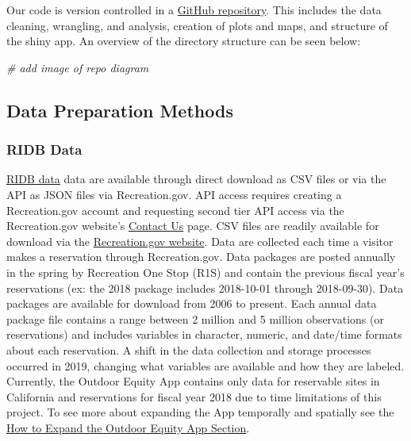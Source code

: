 \documentclass[
  11 pt,
  openany]{book}
\newenvironment{Shaded}{\begin{snugshade}}{\end{snugshade}}
\newcommand{\CommentTok}[1]{\textcolor[rgb]{0.56,0.35,0.01}{\textit{#1}}}
\begin{document}
Our code is version controlled in a \href{https://github.com/outdoor-equity/outdoor-equity}{GitHub repository}. This includes the data cleaning, wrangling, and analysis, creation of plots and maps, and structure of the shiny app. An overview of the directory structure can be seen below:

\begin{Shaded}
\begin{Highlighting}[]
\CommentTok{\# add image of repo diagram}
\end{Highlighting}
\end{Shaded}

\hypertarget{data-preparation-methods}{%
\subsection{Data Preparation Methods}\label{data-preparation-methods}}

\hypertarget{ridb-data}{%
\subsubsection{RIDB Data}\label{ridb-data}}

\href{https://ridb.recreation.gov/landing}{RIDB data} data are available through direct download as CSV files or via the API as JSON files via Recreation.gov. API access requires creating a Recreation.gov account and requesting second tier API access via the Recreation.gov website's \href{https://recreationonestopprod.servicenowservices.com/external?id=external_contact_us}{Contact Us} page. CSV files are readily available for download via the \href{https://ridb.recreation.gov/download}{Recreation.gov website}. Data are collected each time a visitor makes a reservation through Recreation.gov. Data packages are posted annually in the spring by Recreation One Stop (R1S) and contain the previous fiscal year's reservations (ex: the 2018 package includes 2018-10-01 through 2018-09-30). Data packages are available for download from 2006 to present. Each annual data package file contains a range between 2 million and 5 million observations (or reservations) and includes variables in character, numeric, and date/time formats about each reservation. A shift in the data collection and storage processes occurred in 2019, changing what variables are available and how they are labeled. Currently, the Outdoor Equity App contains only data for reservable sites in California and reservations for fiscal year 2018 due to time limitations of this project. To see more about expanding the App temporally and spatially see the \protect\hyperlink{how-to-expand-the-outdoor-equity-app}{How to Expand the Outdoor Equity App Section}.
\end{document}
